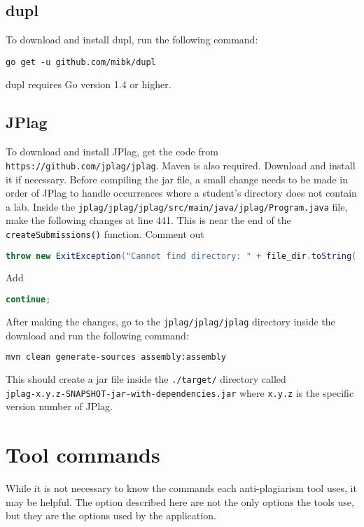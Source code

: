 \documentclass[12pt]{article}
\begin{document}
		\subsection{dupl}
			To download and install dupl, run the following command:
			\begin{lstlisting}[breaklines=true]	
go get -u github.com/mibk/dupl
			\end{lstlisting}
			\noindent dupl requires Go version 1.4 or higher.
			
		\subsection{JPlag}
			To download and install JPlag, get the code from \\\verb|https://github.com/jplag/jplag|. Maven is also required. Download and install it if necessary. Before compiling the jar file, a small change needs to be made in order of JPlag to handle occurrences where a student's directory does not contain a lab. Inside the \verb|jplag/jplag/jplag/src/main/java/jplag/Program.java| file, make the following changes at line 441. This is near the end of the \verb|createSubmissions()| function. 
			Comment out
\begin{lstlisting}[language=java]
throw new ExitException("Cannot find directory: " + file_dir.toString());
\end{lstlisting}
			Add
\begin{lstlisting}[language=java]
continue;
\end{lstlisting}
			After making the changes, go to the \verb|jplag/jplag/jplag| directory inside the download and run the following command:
			\begin{lstlisting}[language=bash]
mvn clean generate-sources assembly:assembly
			\end{lstlisting}
			This should create a jar file inside the \verb|./target/| directory called \\\verb|jplag-x.y.z-SNAPSHOT-jar-with-dependencies.jar| where \verb|x.y.z| is the specific version number of JPlag.
			
	\section{Tool commands}
		While it is not necessary to know the commands each anti-plagiarism tool uses, it may be helpful. The option described here are not the only options the tools use, but they are the options used by the application.
		
\end{document}
